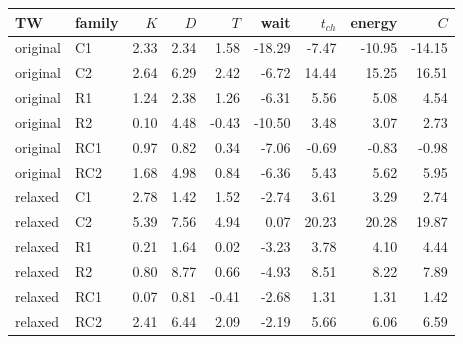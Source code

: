 \begin{tabular}{llrrrrrrr}
\toprule
TW & family & $K$ & $D$ & $T$ & wait & $t_{ch}$ & energy & $C$ \\
\midrule
original & C1 & 2.33 & 2.34 & 1.58 & -18.29 & -7.47 & -10.95 & -14.15 \\
original & C2 & 2.64 & 6.29 & 2.42 & -6.72 & 14.44 & 15.25 & 16.51 \\
original & R1 & 1.24 & 2.38 & 1.26 & -6.31 & 5.56 & 5.08 & 4.54 \\
original & R2 & 0.10 & 4.48 & -0.43 & -10.50 & 3.48 & 3.07 & 2.73 \\
original & RC1 & 0.97 & 0.82 & 0.34 & -7.06 & -0.69 & -0.83 & -0.98 \\
original & RC2 & 1.68 & 4.98 & 0.84 & -6.36 & 5.43 & 5.62 & 5.95 \\
relaxed & C1 & 2.78 & 1.42 & 1.52 & -2.74 & 3.61 & 3.29 & 2.74 \\
relaxed & C2 & 5.39 & 7.56 & 4.94 & 0.07 & 20.23 & 20.28 & 19.87 \\
relaxed & R1 & 0.21 & 1.64 & 0.02 & -3.23 & 3.78 & 4.10 & 4.44 \\
relaxed & R2 & 0.80 & 8.77 & 0.66 & -4.93 & 8.51 & 8.22 & 7.89 \\
relaxed & RC1 & 0.07 & 0.81 & -0.41 & -2.68 & 1.31 & 1.31 & 1.42 \\
relaxed & RC2 & 2.41 & 6.44 & 2.09 & -2.19 & 5.66 & 6.06 & 6.59 \\
\bottomrule
\end{tabular}
